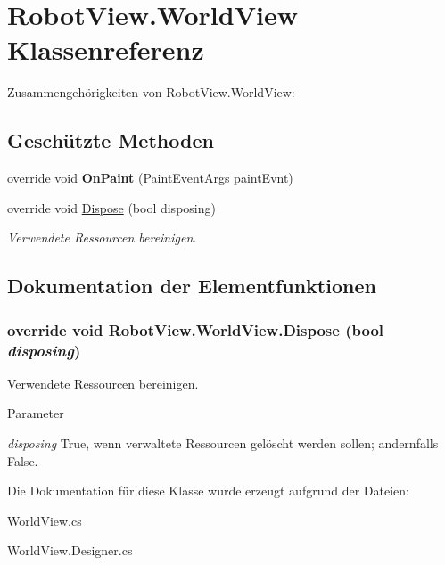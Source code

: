 \hypertarget{class_robot_view_1_1_world_view}{
\section{RobotView.WorldView Klassenreferenz}
\label{class_robot_view_1_1_world_view}
}


Zusammengehörigkeiten von RobotView.WorldView:\subsection*{Geschützte Methoden}
\begin{DoxyCompactItemize}
\item 
\hypertarget{class_robot_view_1_1_world_view_ad50b0a0a0c4bdc7e027eb536db6bba35}{
override void {\bfseries OnPaint} (PaintEventArgs paintEvnt)}
\label{class_robot_view_1_1_world_view_ad50b0a0a0c4bdc7e027eb536db6bba35}

\item 
override void \hyperlink{class_robot_view_1_1_world_view_ae412a0d88561b075a22955c6e0b41aca}{Dispose} (bool disposing)
\begin{DoxyCompactList}\small\item\em Verwendete Ressourcen bereinigen. \item\end{DoxyCompactList}\end{DoxyCompactItemize}


\subsection{Dokumentation der Elementfunktionen}
\hypertarget{class_robot_view_1_1_world_view_ae412a0d88561b075a22955c6e0b41aca}{
\subsubsection[{Dispose}]{\setlength{\rightskip}{0pt plus 5cm}override void RobotView.WorldView.Dispose (bool {\em disposing})}}
\label{class_robot_view_1_1_world_view_ae412a0d88561b075a22955c6e0b41aca}


Verwendete Ressourcen bereinigen. 


\begin{DoxyParams}{Parameter}
\item[{\em disposing}]True, wenn verwaltete Ressourcen gelöscht werden sollen; andernfalls False.\end{DoxyParams}


Die Dokumentation für diese Klasse wurde erzeugt aufgrund der Dateien:\begin{DoxyCompactItemize}
\item 
WorldView.cs\item 
WorldView.Designer.cs\end{DoxyCompactItemize}
